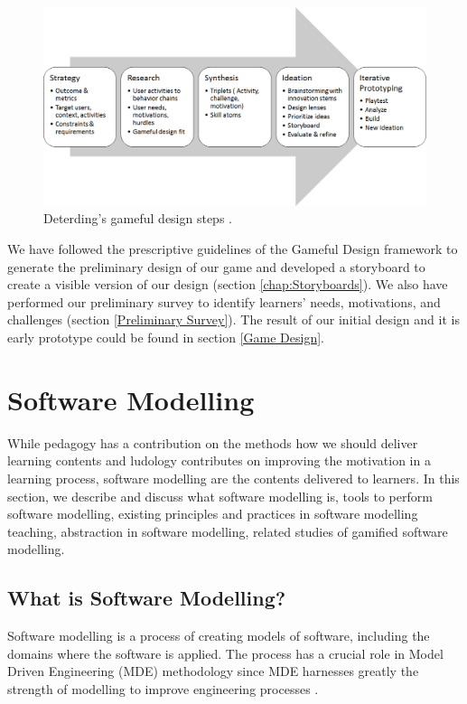 \documentclass[12pt, a4paper]{report}
\begin{document}
\begin{figure}[ht]
\centering
\includegraphics[width=12cm]{gameful-steps}
\caption{Deterding's gameful design steps \cite{deterding2015lens}.}
\label{fig:gameful-steps}
\end{figure}

We have followed the prescriptive guidelines of the Gameful Design framework to generate the preliminary design of our game and developed a storyboard to create a visible version of our design (section \ref{chap:Storyboards}). We also have performed our preliminary survey to identify learners' needs, motivations, and challenges (section \ref{Preliminary Survey}). The result of our initial design and it is early prototype could be found in section \ref{Game Design}. 

\section{Software Modelling}
While pedagogy has a contribution on the methods how we should deliver learning contents and ludology contributes on improving the motivation in a learning process, software modelling are the contents delivered to learners. In this section, we describe and discuss what software modelling is, tools to perform software modelling, existing principles and practices in software modelling teaching, abstraction in software modelling, related studies of gamified software modelling.    

\subsection{What is Software Modelling?}
Software modelling is a process of creating models of software, including the domains where the software is applied. The process has a crucial role in Model Driven Engineering (MDE) methodology since MDE harnesses greatly the strength of modelling to improve engineering processes \cite{brambilla2012model}.  
\end{document}
